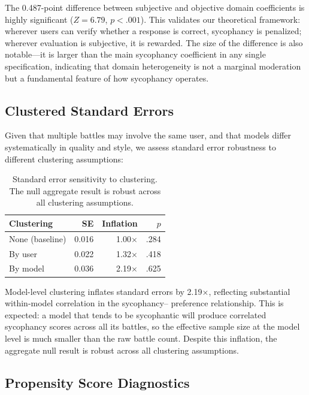 \documentclass[11pt,twocolumn,a4paper]{article}
\begin{document}
The 0.487-point difference between subjective and objective domain
coefficients is highly significant ($Z = 6.79$, $p < .001$). This
validates our theoretical framework: wherever users can verify
whether a response is correct, sycophancy is penalized; wherever
evaluation is subjective, it is rewarded. The size of the difference
is also notable---it is larger than the main sycophancy coefficient
in any single specification, indicating that domain heterogeneity
is not a marginal moderation but a fundamental feature of how
sycophancy operates.

\subsection{Clustered Standard Errors}

Given that multiple battles may involve the same user, and that models
differ systematically in quality and style, we assess standard error
robustness to different clustering assumptions:

\begin{table}[t]
  \centering
  \caption{Standard error sensitivity to clustering.
    The null aggregate result is robust across all clustering
    assumptions.}
  \label{tab:clustering}
  \begin{tabular}{lrrr}
    \toprule
    Clustering & SE & Inflation & $p$ \\
    \midrule
    None (baseline) & 0.016 & 1.00$\times$ & .284 \\
    By user         & 0.022 & 1.32$\times$ & .418 \\
    By model        & 0.036 & 2.19$\times$ & .625 \\
    \bottomrule
  \end{tabular}
\end{table}

Model-level clustering inflates standard errors by 2.19$\times$,
reflecting substantial within-model correlation in the sycophancy--
preference relationship. This is expected: a model that tends to be
sycophantic will produce correlated sycophancy scores across all its
battles, so the effective sample size at the model level is much
smaller than the raw battle count. Despite this inflation, the
aggregate null result is robust across all clustering assumptions.

\subsection{Propensity Score Diagnostics}
\end{document}
